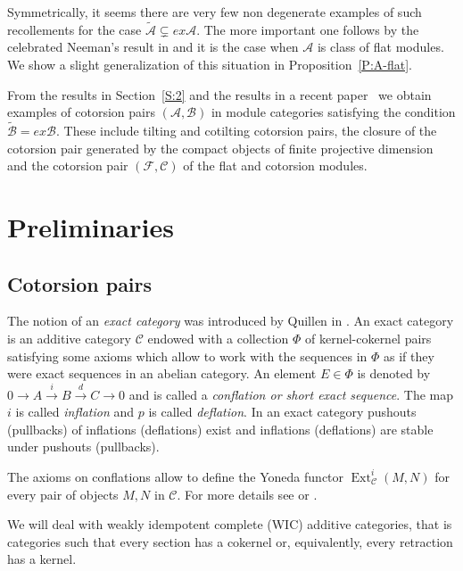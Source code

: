 \documentclass[11pt,a4paper,reqno]{amsart}
\newcommand{\Ext}{\operatorname{Ext}}
\newcommand{\A}{\mathcal{A}}
\newcommand{\B}{\mathcal{B}}
\newcommand{\C}{\mathcal{C}}
\newcommand{\F}{\mathcal{F}}
\theoremstyle{plain}
\theoremstyle{definition}
\theoremstyle{remark}
\begin{document}
Symmetrically, it seems there are very few non degenerate examples of such recollements for the case $\widetilde{\A}\subsetneq ex\A$. The more important one follows by the celebrated Neeman's result in \cite{Nee08} and it is the case when $\A$ is class of flat modules. We show a slight generalization of this situation in Proposition~\ref{P:A-flat}.%

From the results in Section~\ref{S:2} and the results in a recent paper~\cite{BCIE} we obtain examples of cotorsion pairs $(\A, \B)$ in module categories satisfying the condition $\widetilde{\B}=ex\B$. These include tilting and cotilting cotorsion pairs, the closure of the cotorsion pair generated by the compact objects of finite projective dimension and the cotorsion pair $(\F, \C)$ of the flat and cotorsion modules.

\section{Preliminaries}

\subsection{Cotorsion pairs}\label{S:cot-pair}

The notion of an \emph{exact category} was introduced by Quillen in \cite{Q}.
 An exact category is an additive category  $\C$ endowed with  a collection $\Phi$ of kernel-cokernel pairs  satisfying some axioms which allow to work with the sequences  in $\Phi$ as if they were exact sequences in an abelian category. An element $E\in \Phi$ is denoted by $0\to A\overset{i}\to B\overset{d}\to C\to 0$ and is called a \emph{conflation or short exact sequence}. The map $i$ is called \emph{inflation} and $p$ is called \emph{deflation}.
In an exact category pushouts (pullbacks) of inflations (deflations) exist and inflations (deflations) are stable under pushouts (pullbacks).

The axioms on conflations allow to define the Yoneda functor $\Ext^i_{\C}(M,N)$ for every pair of objects $M,N$
 in $\C$.
For more details see \cite{Kel90} or \cite{Bu}.

We will deal with weakly idempotent complete (WIC) additive categories, that is categories such that every section has a cokernel or, equivalently, every retraction has a kernel.
\end{document}
